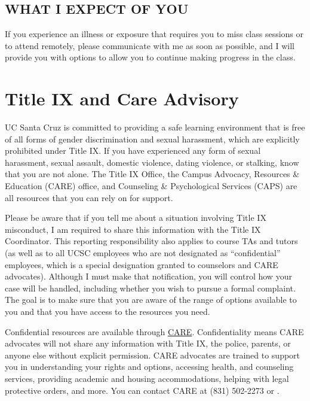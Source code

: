 \documentclass[12pt]{article}
\begin{document}
\subsection{WHAT I EXPECT OF YOU}
If you experience an illness or exposure that requires you to miss class sessions or to attend remotely, please communicate with me as soon as possible, and I will provide you with options to allow you to continue making progress in the class. 

\section{Title IX and Care Advisory}
UC Santa Cruz is committed to providing a safe learning environment that is free of all forms of gender discrimination and sexual harassment, which are explicitly prohibited under Title IX. If you have experienced any form of sexual harassment, sexual assault, domestic violence, dating violence, or stalking, know that you are not alone. The Title IX Office, the Campus Advocacy, Resources \& Education (CARE) office, and Counseling \& Psychological Services (CAPS) are all resources that you can rely on for support. 

Please be aware that if you tell me about a situation involving Title IX misconduct, I am required to share this information with the Title IX Coordinator. This reporting responsibility also applies to course TAs and tutors (as well as to all UCSC employees who are not designated as ``confidential'' employees, which is a special designation granted to counselors and CARE advocates). Although I must make that notification, you will control how your case will be handled, including whether you wish to pursue a formal complaint. The goal is to make sure that you are aware of the range of options available to you and that you have access to the resources you need. 

Confidential resources are available through \href{https://care.ucsc.edu/}{CARE}. Confidentiality means CARE advocates will not share any information with Title IX, the police, parents, or anyone else without explicit permission. CARE advocates are trained to support you in understanding your rights and options, accessing health, and counseling services, providing academic and housing accommodations, helping with legal protective orders, and more. You can contact CARE at (831) 502-2273 or .
\end{document}
